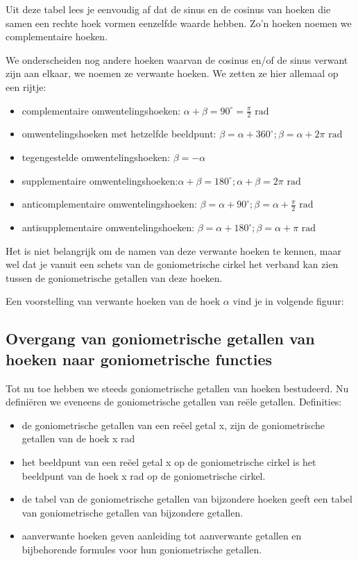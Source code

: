 Uit deze tabel lees je eenvoudig af dat de sinus en de  cosinus van hoeken die samen een rechte hoek vormen eenzelfde waarde hebben. Zo’n hoeken noemen we complementaire hoeken.

We onderscheiden nog andere hoeken waarvan de cosinus en/of de sinus verwant zijn aan elkaar, we noemen ze verwante hoeken. We zetten ze hier allemaal op een rijtje:
\begin{itemize}
	\item complementaire omwentelingshoeken: $\alpha + \beta = 90^\circ= \frac{\pi}{2} \text{ rad}$
	\item omwentelingshoeken met hetzelfde beeldpunt: $\beta = \alpha + 360^\circ; \beta = \alpha + 2 \pi \text{ rad}$
	\item tegengestelde omwentelingshoeken: $\beta = -\alpha$
	\item supplementaire omwentelingshoeken:$\alpha + \beta = 180^\circ; \alpha + \beta = 2 \pi \text{ rad}$
	\item anticomplementaire omwentelingshoeken: $\beta = \alpha + 90^\circ; \beta = \alpha + \frac{\pi}{2} \text{ rad}$
	\item antisupplementaire omwentelingshoeken: $\beta = \alpha + 180^\circ;  \beta = \alpha + \pi \text{ rad}$
\end{itemize}

Het is niet belangrijk om de namen van deze verwante hoeken te kennen, maar wel dat je vanuit een schets van de goniometrische cirkel het verband kan zien tussen de goniometrische getallen van deze hoeken.

Een voorstelling van verwante hoeken van de hoek $\alpha$ vind je in volgende figuur:

\begin{figure}[H]
	\centering 
	 
\end{figure}

\subsection{Overgang van goniometrische getallen van hoeken naar goniometrische functies}

Tot nu toe hebben we steeds goniometrische getallen van hoeken bestudeerd.
Nu definiëren we eveneens de goniometrische getallen van reële getallen.
Definities:
\begin{itemize}
	\item de goniometrische getallen van een reëel getal x, zijn de goniometrische getallen van de hoek x rad
\item het beeldpunt van een reëel getal x op de goniometrische cirkel is het beeldpunt van de hoek x rad op de goniometrische cirkel.
\item de tabel van de goniometrische getallen van bijzondere hoeken geeft een tabel van goniometrische getallen van bijzondere getallen.
\item aanverwante hoeken geven aanleiding tot aanverwante getallen en bijbehorende formules voor hun goniometrische getallen.
\end{itemize}

